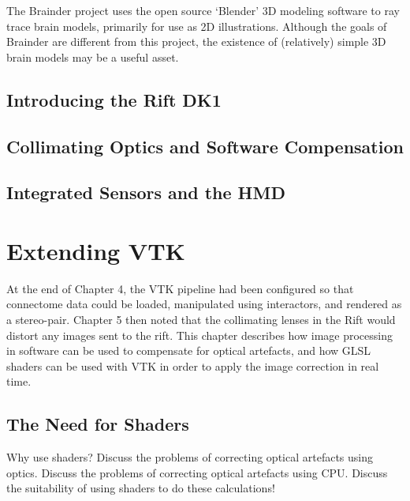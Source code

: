 \documentclass[MSc,paper=a4,pagesize=auto]{icldt}
\begin{document}
The Brainder project uses the open source ‘Blender’ 3D modeling software to ray trace brain models, primarily for use as 2D illustrations. Although the goals of Brainder are different from this project, the existence of (relatively) simple 3D brain models may be a useful asset. 



\section{Introducing the Rift DK1}
\section{Collimating Optics and Software Compensation}
\section{Integrated Sensors and the HMD}

\chapter{Extending VTK}
At the end of Chapter 4, the VTK pipeline had been configured so that connectome data could be loaded, manipulated using interactors, and rendered as a stereo-pair. Chapter 5 then noted that the collimating lenses in the Rift would distort any images sent to the rift. This chapter describes how image processing in software can be used to compensate for optical artefacts, and how GLSL shaders can be used with VTK in order to apply the image correction in real time. 

\section{The Need for Shaders}
\label{sec:need_for_shaders}
Why use shaders?
Discuss the problems of correcting optical artefacts using optics.
Discuss the problems of correcting optical artefacts using CPU. 
Discuss the suitability of using shaders to do these calculations!
\end{document}
